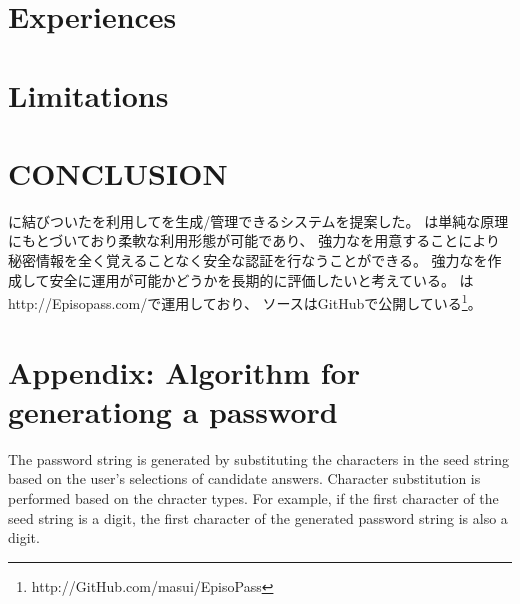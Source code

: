 \documentclass{article}
\begin{document}
\section{Experiences}

\section{Limitations}

% 

\section{CONCLUSION}

{\EM}に結びついた{\SQ}を利用して{\PW}を生成/管理できるシステム{\EP}を提案した。
{\EP}は単純な原理にもとづいており柔軟な利用形態が可能であり、
強力な{\SQ}を用意することにより
秘密情報を全く覚えることなく安全な認証を行なうことができる。
%
強力な{\SQ}を作成して安全に運用が可能かどうかを長期的に評価したいと考えている。
%
%
{\EP}は\textsf{http://Episopass.com/}で運用しており、
ソースはGitHubで公開している\footnote{
  \textsf{http://GitHub.com/masui/EpisoPass}
}。

{\scriptsize


}

\section*{Appendix: Algorithm for generationg a password}



The password string is generated by
substituting the characters in the seed string
based on the user's selections of candidate answers.
Character substitution is performed based on the chracter types.
For example, if the first character of the seed string is a digit,
the first character of the generated password string is also a digit.
\end{document}
